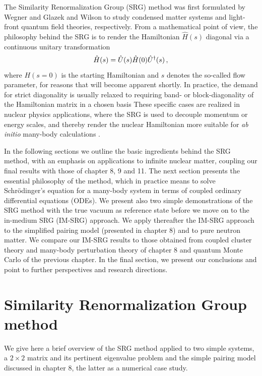 The Similarity Renormalization Group (SRG) method was first formulated by
Wegner \cite{wegner1994} and Glazek and Wilson \cite{glazek1993}
to study condensed matter systems and light-front quantum field
theories, respectively.  From a mathematical point of view, the
philosophy behind the SRG is to render the Hamiltonian $\hat{H}(s)$
diagonal via a continuous unitary transformation
\begin{equation}\label{eq:cut}
  \hat{H}(s)=\hat{U}(s)\hat{H}(0)\UUO(s)\,,
\end{equation}
where $H(s=0)$ is the starting Hamiltonian and $s$ denotes the so-called flow
parameter, for reasons that will become apparent shortly. In practice, the demand 
for strict diagonality is usually relaxed to requiring band- or block-diagonality 
of the Hamiltonian matrix in a chosen basis
These specific cases are realized in nuclear
physics applications, where the SRG is used to decouple momentum or
energy scales, and thereby render the nuclear Hamiltonian more
suitable for \emph{ab initio} many-body calculations \cite{bogner2007,bogner2010,morris2015,bogner2016}.

In the following sections we outline the basic ingredients behind the
SRG method, with an emphasis on applications to infinite nuclear
matter, coupling our final results with those of chapter 8, 9 and
11. The next section presents the essential philosophy of the method,
which in practice means to solve Schr\"odinger's equation for a
many-body system in terms of coupled ordinary differential equations
(ODEs). We present also two simple demonstrations of the SRG method with the true vacuum as reference state before
we move on to the in-medium SRG (IM-SRG) approach. 
We apply thereafter the IM-SRG approach to the simplified pairing  model (presented in chapter 8) and 
to pure neutron matter. We compare our IM-SRG results to those obtained from coupled cluster theory and many-body perturbation theory of  chapter 8 and quantum Monte Carlo of the previous chapter.  In the final section, we present our conclusions and point  to further
perspectives and research directions.

\section{Similarity Renormalization Group method}

We give here a brief overview of the SRG method applied to two simple systems,  a $2\times 2$ matrix and its pertinent eigenvalue problem and the simple pairing model discussed in chapter 8, the latter as a numerical case study. 

